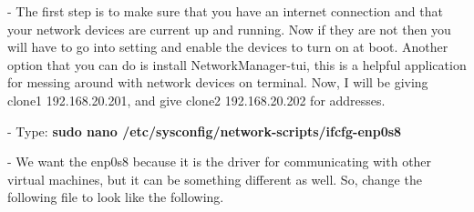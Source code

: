 \documentclass[11pt, a4papper]{article}
\begin{document}
\begin{adjustwidth}{3cm}{} 
\begin{adjustwidth}{}{} 
\indent - The first step is to make sure that you have an internet connection and that your network devices are current up and running. Now if they are not then you will have to go into setting and enable the devices to turn on at boot. Another option that you can do is install NetworkManager-tui, this is a helpful application for messing around with network devices on terminal. Now, I will be giving clone1 192.168.20.201, and give clone2 192.168.20.202 for addresses. \\
\end{adjustwidth}
\noindent - Type: \textbf{sudo nano /etc/sysconfig/network-scripts/ifcfg-enp0s8} \\
\begin{adjustwidth}{1cm}{} 
\indent - We want the enp0s8 because it is the driver for communicating with other virtual machines, but it can be something different as well. So, change the following file to look like the following.\\
\pagebreak


\end{adjustwidth}
\end{adjustwidth}
\end{document}

